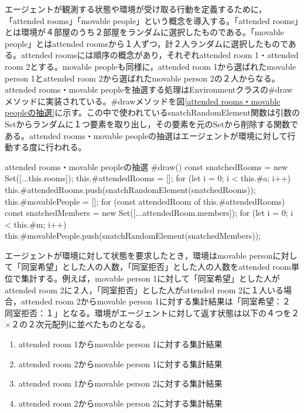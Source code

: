 \documentclass[titlepage]{ltjsreport}
\begin{document}
エージェントが観測する状態や環境が受け取る行動を定義するために，「attended rooms」「movable people」という概念を導入する。「attended rooms」とは環境が４部屋のうち２部屋をランダムに選択したものである。「movable people」とはattended roomsから１人ずつ，計２人ランダムに選択したものである。attended roomsには順序の概念があり，それぞれattended room 1・attended room 2とする。movable peopleも同様に，attended room 1から選ばれたmovable person 1とattended room 2から選ばれたmovable person 2の２人からなる。attended rooms・movable peopleを抽選する処理はEnvironmentクラスの\#drawメソッドに実装されている。\#drawメソッドを図\ref{attended rooms・movable peopleの抽選}に示す。この中で使われているsnatchRandomElement関数は引数のSetからランダムに１つ要素を取り出し，その要素を元のSetから削除する関数である。attended rooms・movable peopleの抽選はエージェントが環境に対して行動する度に行われる。
\begin{textbox}{attended rooms・movable peopleの抽選}
#draw() {
	const snatchedRooms = new Set([...this.rooms]);
	this.#attendedRooms = [];
	for (let i = 0; i < this.#a; i++) {
		this.#attendedRooms.push(snatchRandomElement(snatchedRooms));
	}
	this.#movablePeople = [];
	for (const attendedRoom of this.#attendedRooms) {
		const snatchedMembers = new Set([...attendedRoom.members]);
		for (let i = 0; i < this.#m; i++) {
			this.#movablePeople.push(snatchRandomElement(snatchedMembers));
		}
	}
}
\end{textbox}

エージェントが環境に対して状態を要求したとき，環境はmovable personに対して「同室希望」とした人の人数，「同室拒否」とした人の人数をattended room単位で集計する。例えば，movable person 1に対して「同室希望」とした人がattended room 2に２人，「同室拒否」とした人がattended room 2に１人いる場合，attended room 2からmovable person 1に対する集計結果は「同室希望：２　同室拒否：１」となる。環境がエージェントに対して返す状態は以下の４つを２×２の２次元配列に並べたものとなる。
\begin{enumerate}
\item attended room 1からmovable person 1に対する集計結果
\item attended room 2からmovable person 1に対する集計結果
\item attended room 1からmovable person 2に対する集計結果
\item attended room 2からmovable person 2に対する集計結果
\end{enumerate}
\end{document}
